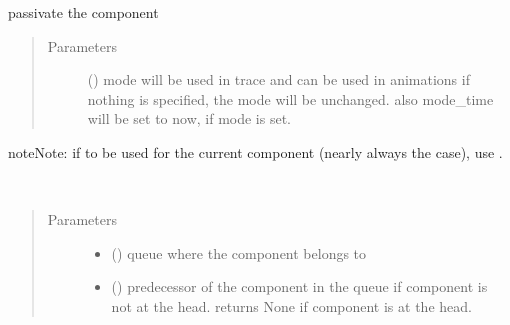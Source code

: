 \documentclass[letterpaper,10pt,english]{sphinxmanual}
\begin{document}
\begin{fulllineitems}
\begin{fulllineitems}
\end{fulllineitems}


\begin{fulllineitems}
\label{\detokenize{Reference:salabim.Component.passivate}}
passivate the component
\begin{quote}\begin{description}
\item[{Parameters}] \leavevmode
{} () \textendash{} mode 
will be used in trace and can be used in animations 
if nothing is specified, the mode will be unchanged. 
also mode\_time will be set to now, if mode is set.

\end{description}\end{quote}

\begin{sphinxadmonition}{note}{Note:}
if to be used for the current component (nearly always the case), use .
\end{sphinxadmonition}

\end{fulllineitems}


\begin{fulllineitems}
\label{\detokenize{Reference:salabim.Component.predecessor}}~\begin{quote}\begin{description}
\item[{Parameters}] \leavevmode\begin{itemize}
\item {} 
 ({\hyperref[\detokenize{Reference:salabim.Queue}]{}}) \textendash{} queue where the component belongs to

\item {} 
 ({\hyperref[\detokenize{Reference:salabim.Component}]{}}) \textendash{} predecessor of the component in the queue
if component is not at the head. 
returns None if component is at the head.


\end{itemize}
\end{description}
\end{quote}
\end{fulllineitems}
\end{fulllineitems}
\end{document}
